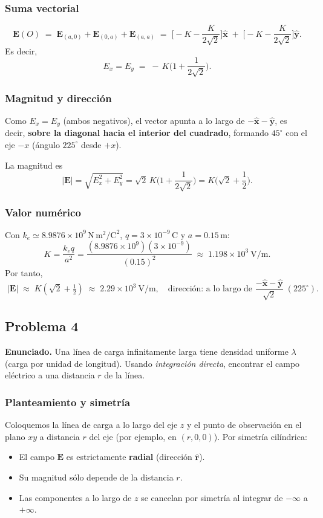 \documentclass{article}
\begin{document}
\subsubsection*{Suma vectorial}
\[
\mathbf E(O) \;=\; \mathbf E_{(a,0)}+\mathbf E_{(0,a)}+\mathbf E_{(a,a)}
\;=\; \bigg[-K-\frac{K}{2\sqrt{2}}\bigg]\hat{\mathbf x}
\;+\; \bigg[-K-\frac{K}{2\sqrt{2}}\bigg]\hat{\mathbf y}.
\]
Es decir,
\[
E_x=E_y \;=\; -\,K\Big(1+\frac{1}{2\sqrt{2}}\Big).
\]

\subsubsection*{Magnitud y dirección}
Como $E_x=E_y$ (ambos negativos), el vector apunta a lo largo de $-\hat{\mathbf x}-\hat{\mathbf y}$, es decir, \textbf{sobre la diagonal hacia el interior del cuadrado}, formando $45^\circ$ con el eje $-x$ (ángulo $225^\circ$ desde $+x$).

La magnitud es
\[
\lvert \mathbf E \rvert
=\sqrt{E_x^2+E_y^2}
=\sqrt{2}\,K\Big(1+\frac{1}{2\sqrt{2}}\Big)
= K\Big(\sqrt{2}+\frac{1}{2}\Big).
\]

\subsubsection*{Valor numérico}
Con $k_e\simeq 8.9876\times 10^9\,\mathrm{N\,m^2/C^2}$, $q=3\times 10^{-9}\,\mathrm{C}$ y $a=0.15\,\mathrm{m}$:
\[
K=\frac{k_e q}{a^2}=
\frac{(8.9876\times 10^9)(3\times 10^{-9})}{(0.15)^2}
\;\approx\; 1.198\times 10^{3}\ \mathrm{V/m}.
\]
Por tanto,
\[
\boxed{\;
\lvert \mathbf E \rvert \;\approx\; K\!\left(\sqrt{2}+\tfrac{1}{2}\right)
\;\approx\; 2.29\times 10^{3}\ \mathrm{V/m},
\quad
\text{dirección: a lo largo de } \frac{-\hat{\mathbf x}-\hat{\mathbf y}}{\sqrt{2}}\;(225^\circ).\;
}
\]


\subsection{Problema 4} \vspace{0.5cm}

\textbf{Enunciado.} Una línea de carga infinitamente larga tiene densidad uniforme $\lambda$ (carga por unidad de longitud). Usando \emph{integración directa}, encontrar el campo eléctrico a una distancia $r$ de la línea.

\subsubsection*{Planteamiento y simetría}
Coloquemos la línea de carga a lo largo del eje $z$ y el punto de observación en el plano $xy$ a distancia $r$ del eje (por ejemplo, en $(r,0,0)$). Por simetría cilíndrica:
\begin{itemize}
  \item El campo $\mathbf{E}$ es estrictamente \textbf{radial} (dirección $\hat{\mathbf r}$).
  \item Su magnitud sólo depende de la distancia $r$.
  \item Las componentes a lo largo de $z$ se cancelan por simetría al integrar de $-\infty$ a $+\infty$.
\end{itemize}
\end{document}
